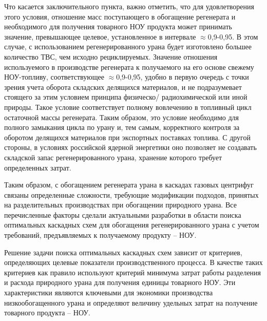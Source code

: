 \begin{enumerate}
\end{enumerate}

Что касается заключительного пункта, важно отметить, что для удовлетворения этого условия, отношение масс поступающего в обогащение регенерата и необходимого для получения товарного НОУ продукта может принимать значение, превышающее целевое, установленное в интервале $\approx$0,9-0,95. В этом случае, с использованием регенерированного урана будет изготовлено большее количество ТВС, чем исходно рециклируемых. Значение отношения используемого в производстве регенерата к получаемого на его основе свежему НОУ-топливу, соответствующее $\approx$0,9-0,95, удобно в первую очередь с точки зрения учета оборота складских делящихся материалов, и не подразумевает стоящего за этим условием принципа физическо/ радиохимической или иной природы.  Такое условие соответствует полному вовлечению в топливный цикл остаточной массы регенерата. Таким образом, это условие необходимо для полного замыкания цикла по урану и, тем самым, корректного контроля за оборотом делящихся материалов при экспортных поставках топлива. С другой стороны, в условиях российской ядерной энергетики оно позволяет не создавать складской запас регенерированного урана, хранение которого требует определенных затрат.

Таким образом, с обогащением регенерата урана в каскадах газовых центрифуг связаны определенные сложности, требующие модификации подходов, принятых на разделительных производствах при обогащении природного урана. Все перечисленные факторы сделали актуальными разработки в области поиска оптимальных каскадных схем для обогащения регенерированного урана с учетом требований, предъявляемых к получаемому продукту -- НОУ.

Решение задачи поиска оптимальных каскадных схем зависит от критериев, определяющих целевые показатели производственного процесса.
В качестве таких критериев как правило используют критерий минимума затрат работы разделения и расхода природного урана для получения единицы товарного НОУ. Эти характеристики являются ключевыми для экономики производства низкообогащенного урана и определяют величину удельных затрат на получение товарного продукта -- НОУ.

